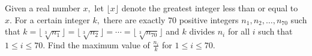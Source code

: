 Given a real number $x,$ let $\lfloor x \rfloor$ denote the greatest integer less than or equal to $x.$ For a certain integer $k,$ there are exactly $70$ positive integers $n_{1}, n_{2}, \ldots, n_{70}$ such that $k=\lfloor\sqrt[3]{n_{1}}\rfloor = \lfloor\sqrt[3]{n_{2}}\rfloor = \cdots = \lfloor\sqrt[3]{n_{70}}\rfloor$ and $k$ divides $n_{i}$ for all $i$ such that $1 \leq i \leq 70.$
Find the maximum value of $\frac{n_{i}}{k}$ for $1\leq i \leq 70.$